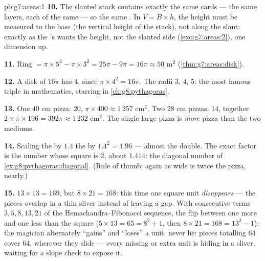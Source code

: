 \begin{solution}{pb:g7:areas:1}
\textbf{10.} The slanted stack contains exactly the same cards
--- the same layers, each of the same  --- so the same
. In $V = B \times h$, the height must be measured
\emph{} to the base (the vertical height of the
stack), not along the slant: exactly as the 's
 wants the  height, not the slanted side
(\cref{exo:g7:areas:2}), one dimension up.

\textbf{11.} Ring $= \pi \times 5^2 - \pi \times 3^2 = 25\pi -
9\pi = 16\pi \approx 50$ m$^2$ (\cref{thm:g7:areas:disk}).

\textbf{12.} A disk of  $16\pi$ has  $4$, since
$\pi \times 4^2 = 16\pi$. The radii $3$, $4$, $5$: the most
famous triple in mathematics, starring in
\cref{ch:g8:pythagoras}.

\textbf{13.} One $40$ cm pizza:  $20$,
 $\pi \times 400 \approx 1\,257$ cm$^2$. Two $28$ cm
pizzas:  $14$, together
$2 \times \pi \times 196 = 392\pi \approx 1\,232$ cm$^2$. The
single large pizza is \emph{more} pizza than the two mediums.

\textbf{14.} Scaling the  by $1.4$  the  by
$1.4^2 = 1.96$ --- almost the double. The exact factor is the
number whose square is $2$, about $1.414$: the diagonal number
of \cref{ex:g8:pythagoras:diagonal}. (Rule of thumb:  again
as wide is twice the pizza, nearly.)

\textbf{15.} $13 \times 13 = 169$, but $8 \times 21 = 168$:
this time one square unit \emph{disappears} --- the pieces
overlap in a thin sliver instead of leaving a gap. With
consecutive terms $3, 5, 8, 13, 21$ of the
Hemachandra--Fibonacci sequence, the  flip between one
more and one less than the square ($5 \times 13 = 65 =
8^2 + 1$, then $8 \times 21 = 168 = 13^2 - 1$): the magician
alternately ``gains'' and ``loses'' a unit.  never lie:
pieces totalling $64$ cover $64$, wherever they slide --- every
missing or extra unit is hiding in a sliver, waiting for a slope
check to expose it.
\end{solution}
